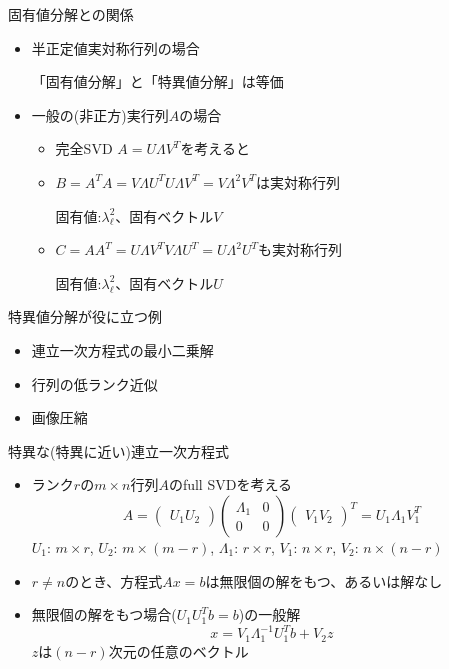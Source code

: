 \documentclass[dvipdfmx]{beamer}
\begin{document}
\begin{frame}[t,fragile]{固有値分解との関係}
  \begin{itemize}
    \setlength{\itemsep}{1em}
  \item 半正定値実対称行列の場合

    「固有値分解」と「特異値分解」は等価
  \item 一般の(非正方)実行列$A$の場合
    \begin{itemize}
      \setlength{\itemsep}{1em}
    \item 完全SVD  $A=U \Lambda V^T$を考えると
    \item $B=A^T A = V \Lambda U^T U \Lambda V^T = V \Lambda^2 V^T$は実対称行列

      固有値:$\lambda_\ell^2$、固有ベクトル$V$
    \item $C=A A^T = U \Lambda V^T V \Lambda U^T = U \Lambda^2 U^T$も実対称行列

      固有値:$\lambda_\ell^2$、固有ベクトル$U$
    \end{itemize}
  \end{itemize}
\end{frame}

\begin{frame}[t,fragile]{特異値分解が役に立つ例}
  \begin{itemize}
    \setlength{\itemsep}{1em}
  \item 連立一次方程式の最小二乗解
  \item 行列の低ランク近似
  \item 画像圧縮
  \end{itemize}
\end{frame}

\begin{frame}[t,fragile]{特異な(特異に近い)連立一次方程式}
  \begin{itemize}
  \item ランク$r$の$m \times n$行列$A$のfull SVDを考える
    \[
    A = \begin{pmatrix} U_1 U_2 \end{pmatrix} \begin{pmatrix} \Lambda_1 & 0 \\ 0 & 0 \end{pmatrix} \begin{pmatrix} V_1 V_2 \end{pmatrix}^T = U_1 \Lambda_1 V_1^T
    \]
    $U_1$: $m \times r$, $U_2$: $m \times (m-r)$, $\Lambda_1$: $r \times r$, $V_1$: $n \times r$, $V_2$: $n \times (n-r)$
  \item $r \ne n$のとき、方程式$Ax=b$は無限個の解をもつ、あるいは解なし
  \item 無限個の解をもつ場合($U_1U_1^Tb=b$)の一般解
    \[
    x = V_1 \Lambda_1^{-1} U_1^T b + V_2 z
    \]
    $z$は$(n-r)$次元の任意のベクトル
  \end{itemize}
\end{frame}
\end{document}
